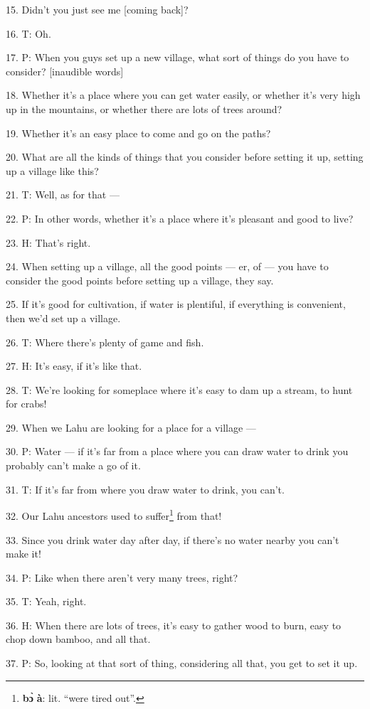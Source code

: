 15. Didn't you just see me [coming back]?

16. T: Oh.

17. P: When you guys set up a new village, what sort of things do you have to consider?
[inaudible words]

18. Whether it's a place where you can get water easily, or whether it's very high
up in the mountains, or whether there are lots of trees around?

19. Whether it's an easy place to come and go on the paths?

20. What are all the kinds of things that you consider before setting it up, setting
up a village like this?

21. T: Well, as for that ---

22. P: In other words, whether it's a place where it's pleasant and good to live?

23. H: That's right.

24. When setting up a village, all the good points --- er, of --- you have to consider
the good points before setting up a village, they say.

25. If it's good for cultivation, if water is plentiful, if everything is convenient,
then we'd set up a village.

26. T: Where there's plenty of game and fish.

27. H: It's easy, if it's like that.

28. T: We're looking for someplace where it's easy to dam up a stream, to hunt
for crabs!

29. When we Lahu are looking for a place for a village ---

30. P: Water --- if it's far from a place where you can draw water to drink you
probably can't make a go of it.

31. T: If it's far from where you draw water to drink, you can't.

32. Our Lahu ancestors used to suffer\footnote{\textbf{bɔ̀} \textbf{à}: lit. ``were tired out''.} from that!

33. Since you drink water day after day, if there's no water nearby you can't make
it!

34. P: Like when there aren't very many trees, right?

35. T: Yeah, right.

36. H: When there are lots of trees, it's easy to gather wood to burn, easy to
chop down bamboo, and all that.

37. P: So, looking at that sort of thing, considering all that, you get to set
it up.

